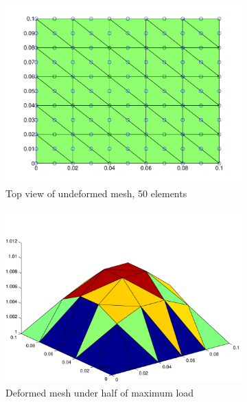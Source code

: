 \documentclass[../main.tex]{subfiles}
\begin{document}
\begin{figure}[ht]
  \centering
  \begin{subfigure}[b]{0.3\textwidth}
    \includegraphics[scale=0.3]{./img/initialMeshT6.pdf}
    \caption{Top view of undeformed mesh, 50 elements}
    \label{fig:prob3initialMeshT6}
  \end{subfigure}%
  \begin{subfigure}[b]{0.3\textwidth}
    \includegraphics[scale=0.3]{./img/halfDeformedMeshT6.pdf}
    \caption{Deformed mesh under half of maximum load}
    \label{fig:prob3DeformedMeshT6}
  \end{subfigure}
  \begin{subfigure}[b]{0.3\textwidth}

\end{subfigure}
\end{figure}
\end{document}
